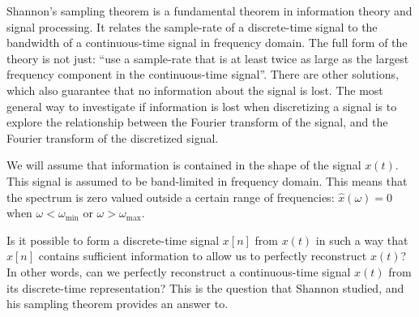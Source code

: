 Shannon's sampling theorem is a fundamental theorem in information theory and signal 
processing. 
It relates the sample-rate of a discrete-time signal to the bandwidth of a continuous-time signal in frequency domain.
The full form of the theory is not just: ``use a sample-rate that is at least twice as large as the largest 
frequency component in the continuous-time signal''. There are other solutions, which also guarantee that no 
information about the signal is lost.
The most general way to investigate if information is lost when discretizing a signal is to explore 
the relationship between the Fourier transform of the signal, and the Fourier transform of the discretized signal.

We will assume that information is contained in the shape of the signal $x(t)$. 
This signal is assumed to be band-limited in frequency domain.
This means that the spectrum is zero valued outside a certain range of frequencies: 
$\hat{x}(\omega) = 0$ when $\omega < \omega_{\mathrm{min}}$ or $\omega > \omega_{\mathrm{max}}$.

Is it possible to form a discrete-time signal $x[n]$ from $x(t)$ in such a way that $x[n]$ contains sufficient information to
allow us to perfectly reconstruct $x(t)$? In other words, can we perfectly reconstruct a continuous-time signal $x(t)$ from
its discrete-time representation? This is the question that Shannon studied, and his sampling theorem provides an answer to.

